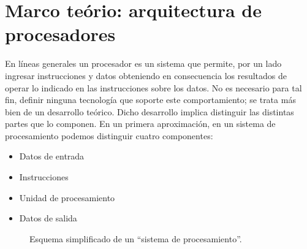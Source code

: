 \chapter{Marco teório: arquitectura de procesadores}
\label{ch:theory}

En líneas generales un procesador es un sistema que permite, por un lado
ingresar instrucciones y datos obteniendo en consecuencia los resultados de
operar lo indicado en las instrucciones sobre los datos. No es necesario para
tal fin, definir ninguna tecnología que soporte este comportamiento; se trata
más bien de un desarrollo teórico. Dicho desarrollo implica distinguir las
distintas partes que lo componen. En un primera aproximación, en un sistema de
procesamiento podemos distinguir cuatro componentes:

\begin{itemize}
  \item Datos de entrada
  \item Instrucciones
  \item Unidad de procesamiento
  \item Datos de salida
\end{itemize}

\begin{figure}
  \centering
  
  \captionsetup{justification=centering}
  \caption{Esquema simplificado de un ``sistema de procesamiento''.}
  \label{fig:C02-sistema_de_procesamiento}
\end{figure}

